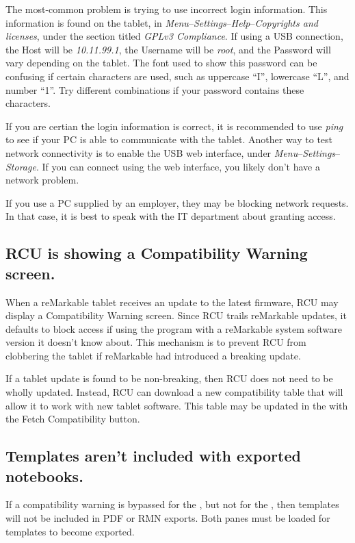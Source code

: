 \documentclass{memoir}
\begin{document}
{The most-common problem is trying to use incorrect login information. This information is found on the tablet, in \textit{Menu}--\textit{Settings}--\textit{Help}--\textit{Copyrights and licenses}, under the section titled \textit{GPLv3 Compliance}. If using a USB connection, the Host will be \textit{10.11.99.1}, the Username will be \textit{root}, and the Password will vary depending on the tablet. The font used to show this password can be confusing if certain characters are used, such as uppercase ``I'', lowercase ``L'', and number ``1''. Try different combinations if your password contains these characters.

If you are certian the login information is correct, it is recommended to use \textit{ping} to see if your PC is able to communicate with the tablet. Another way to test network connectivity is to enable the USB web interface, under \textit{Menu}--\textit{Settings}--\textit{Storage}. If you can connect using the web interface, you likely don't have a network problem.

If you use a PC supplied by an employer, they may be blocking network requests. In that case, it is best to speak with the IT department about granting access.


\subsection{RCU is showing a Compatibility Warning screen.}
When a reMarkable tablet receives an update to the latest firmware, RCU may display a Compatibility Warning screen. Since RCU trails reMarkable updates, it defaults to block access if using the program with a reMarkable system software version it doesn't know about. This mechanism is to prevent RCU from clobbering the tablet if reMarkable had introduced a breaking update.

If a tablet update is found to be non-breaking, then RCU does not need to be wholly updated. Instead, RCU can download a new compatibility table that will allow it to work with new tablet software. This table may be updated in the  with the Fetch Compatibility button.

\subsection{Templates aren't included with exported notebooks.}
If a compatibility warning is bypassed for the , but not for the , then templates will not be included in PDF or RMN exports. Both panes must be loaded for templates to become exported.

}
\end{document}
